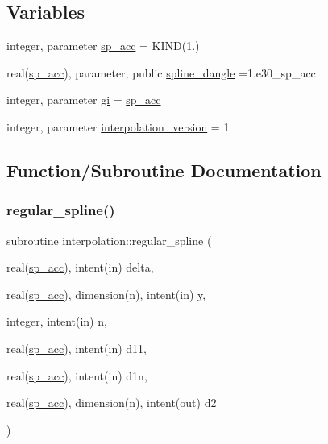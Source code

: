 \subsection*{Variables}
\begin{DoxyCompactItemize}
\item 
integer, parameter \mbox{\hyperlink{namespaceinterpolation_af72aa9a05feb8ef90b2d26e4a013abf3}{sp\+\_\+acc}} = K\+I\+ND(1.)
\item 
real(\mbox{\hyperlink{namespaceinterpolation_af72aa9a05feb8ef90b2d26e4a013abf3}{sp\+\_\+acc}}), parameter, public \mbox{\hyperlink{namespaceinterpolation_a3f75fda9aed3d08991097b0d7c8fc70f}{spline\+\_\+dangle}} =1.e30\+\_\+sp\+\_\+acc
\item 
integer, parameter \mbox{\hyperlink{namespaceinterpolation_a7242dea48715e8170bae81efe12c64be}{gi}} = \mbox{\hyperlink{namespaceinterpolation_af72aa9a05feb8ef90b2d26e4a013abf3}{sp\+\_\+acc}}
\item 
integer, parameter \mbox{\hyperlink{namespaceinterpolation_a49ff5214fde353c8438a404922ce5989}{interpolation\+\_\+version}} = 1
\end{DoxyCompactItemize}


\subsection{Function/\+Subroutine Documentation}
\mbox{\label{namespaceinterpolation_a2864cd829f018329811e906e0b258b6c}} 
\subsubsection{\texorpdfstring{regular\+\_\+spline()}{regular\_spline()}}
{\footnotesize\ttfamily subroutine interpolation\+::regular\+\_\+spline (\begin{DoxyParamCaption}\item[{real(\mbox{\hyperlink{namespaceinterpolation_af72aa9a05feb8ef90b2d26e4a013abf3}{sp\+\_\+acc}}), intent(in)}]{delta,  }\item[{real(\mbox{\hyperlink{namespaceinterpolation_af72aa9a05feb8ef90b2d26e4a013abf3}{sp\+\_\+acc}}), dimension(n), intent(in)}]{y,  }\item[{integer, intent(in)}]{n,  }\item[{real(\mbox{\hyperlink{namespaceinterpolation_af72aa9a05feb8ef90b2d26e4a013abf3}{sp\+\_\+acc}}), intent(in)}]{d11,  }\item[{real(\mbox{\hyperlink{namespaceinterpolation_af72aa9a05feb8ef90b2d26e4a013abf3}{sp\+\_\+acc}}), intent(in)}]{d1n,  }\item[{real(\mbox{\hyperlink{namespaceinterpolation_af72aa9a05feb8ef90b2d26e4a013abf3}{sp\+\_\+acc}}), dimension(n), intent(out)}]{d2 }\end{DoxyParamCaption})}



